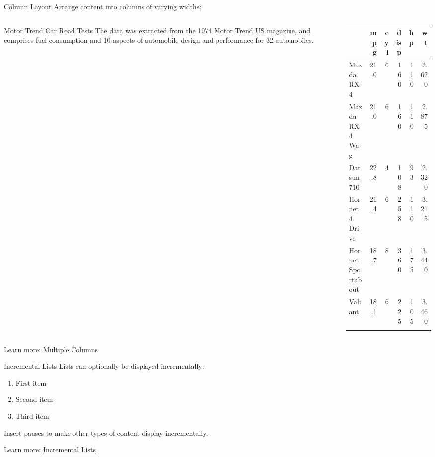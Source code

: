 \documentclass[
  10pt,
  ignorenonframetext,
  aspectratio=1610,
]{beamer}
\newcounter{none} %
\providecommand{\tightlist}{%
  \setlength{\itemsep}{0pt}\setlength{\parskip}{0pt}}
\begin{document}
\begin{frame}{Column Layout}
\protect{}\label{column-layout}
Arrange content into columns of varying widths:

\begin{columns}[T]
\begin{column}{0.35\linewidth}
\begin{block}{Motor Trend Car Road Tests}
\protect{}\label{motor-trend-car-road-tests}
The data was extracted from the 1974 Motor Trend US magazine, and
comprises fuel consumption and 10 aspects of automobile design and
performance for 32 automobiles.
\end{block}
\end{column}

\begin{column}{0.03\linewidth}
\end{column}

\begin{column}{0.62\linewidth}
{\def\LTcaptype{none} %
\begin{longtable}[]{@{}lrrrrr@{}}
\toprule\noalign{}
& mpg & cyl & disp & hp & wt \\
\midrule\noalign{}
\endhead
Mazda RX4 & 21.0 & 6 & 160 & 110 & 2.620 \\
Mazda RX4 Wag & 21.0 & 6 & 160 & 110 & 2.875 \\
Datsun 710 & 22.8 & 4 & 108 & 93 & 2.320 \\
Hornet 4 Drive & 21.4 & 6 & 258 & 110 & 3.215 \\
Hornet Sportabout & 18.7 & 8 & 360 & 175 & 3.440 \\
Valiant & 18.1 & 6 & 225 & 105 & 3.460 \\
\bottomrule\noalign{}
\end{longtable}
}
\end{column}
\end{columns}

Learn more:
\href{https://quarto.org/docs/presentations/revealjs/\#multiple-columns}{Multiple
Columns}
\end{frame}

\begin{frame}{Incremental Lists}
\protect{}\label{incremental-lists}
Lists can optionally be displayed incrementally:

\begin{enumerate}[<+->]
\tightlist
\item
  First item
\item
  Second item
\item
  Third item
\end{enumerate}

\pause

Insert pauses to make other types of content display incrementally.

Learn more:
\href{https://quarto.org/docs/presentations/revealjs/\#incremental-lists}{Incremental
Lists}
\end{frame}
\end{document}
